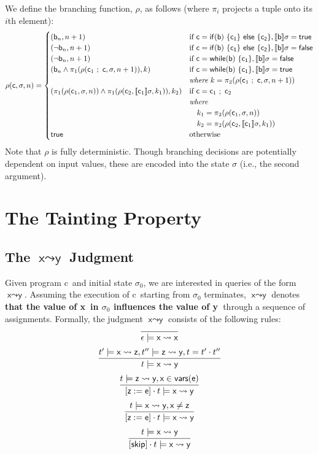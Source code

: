 \documentclass[]{article}
\newcommand{\lsyn}{[\![}
\newcommand{\rsyn}{]\!]}
\newcommand{\jose}[1]{{\textbf{\color{blue} #1}}}
\begin{document}
We define the branching function, $\rho$, as follows (where $\pi_i$ projects a tuple onto its $i$th element):
\[ 
\rho({\sf c},\sigma,n) = \begin{cases} 
({\sf b}_n,n+1) &
	\mbox{if } {\sf c}={\sf if (b)\ \{ c_1 \}\ else\ \{ c_2 \}},\lsyn {\sf b} \rsyn\sigma = {\sf true} \\ 
(\neg {\sf b}_n,n+1) &
	\mbox{if } {\sf c}={\sf if (b)\ \{ c_1 \}\ else\ \{ c_2 \}},\lsyn {\sf b} \rsyn\sigma = {\sf false} \\ 
(\neg {\sf b}_n,n+1) &
	\mbox{if } {\sf c}={\sf while (b)\ \{ c_1 \}},\lsyn {\sf b} \rsyn\sigma = {\sf false} \\ 
({\sf b}_n \wedge \pi_1(\rho({\sf c}_1\ ;\ {\sf c},\sigma,n+1)),k) &\mbox{if } {\sf c}={\sf while (b)\ \{ c_1 \}},\lsyn {\sf b} \rsyn\sigma = {\sf true} \\ 
& \textit{where}\ k = \pi_2(\rho({\sf c}_1\ ;\ {\sf c},\sigma,n+1)) \\
(\pi_1(\rho({\sf c}_1,\sigma,n)) \wedge  \pi_1(\rho({\sf c}_2,\lsyn {\sf c}_1 \rsyn \sigma,k_1)),k_2) &\mbox{if } {\sf c}={\sf c}_1\ ;\ {\sf c}_2 \\ 
& \textit{where} \\
& \quad k_1 = \pi_2(\rho({\sf c}_1,\sigma,n)) \\
& \quad k_2 = \pi_2(\rho({\sf c}_2,\lsyn {\sf c}_1 \rsyn \sigma,k_1)) \\
{\sf true} & \mbox{otherwise}
\end{cases}
\]
Note that $\rho$ is fully deterministic. Though branching decisions are potentially dependent on input values, these are encoded into the state $\sigma$ (i.e., the second argument).

\newcommand{\prog}{{\sf c}}
\newcommand{\progp}{{\sf c'}}
\newcommand{\xvar}{\textsf{x}}
\newcommand{\yvar}{\textsf{y}}
\newcommand{\zvar}{\textsf{z}}
\newcommand{\query}[2]{\textnormal{$#1 \leadsto #2$}}
\section{The Tainting Property}

\subsection{The \query{\xvar}{\yvar} Judgment}

Given program \prog\ and initial state $\sigma_0$, we are interested in queries of the form \query{\xvar}{\yvar}. Assuming the execution of \prog\ starting from $\sigma_0$ terminates, \query{\xvar}{\yvar} denotes \jose{that the value of \xvar\ in $\sigma_0$ influences the value of \yvar\ }through a sequence of assignments. Formally, the judgment \query{\xvar}{\yvar} consists of the following rules:
\[
\infer{\epsilon \models \query{\xvar}{\xvar}}{}
\]
\[
\infer{t \models \query{\xvar}{\yvar}}{t' \models \query{\xvar}{\zvar},t'' \models \query{\zvar}{\yvar},t=t' \cdot t''}
\]
\[
\infer{[{\sf z := e}] \cdot t \models \query{\xvar}{\yvar}}{t \models \query{\zvar}{\yvar},\xvar \in {\sf vars}({\sf e})}
\]
\[
\infer{[{\sf z := e}] \cdot t \models \query{\xvar}{\yvar}}{t \models \query{\xvar}{\yvar},\xvar \neq \zvar}
\]
\[
\infer{[\nocommand] \cdot t \models \query{\xvar}{\yvar}}{t \models \query{\xvar}{\yvar}}
\]
\end{document}
